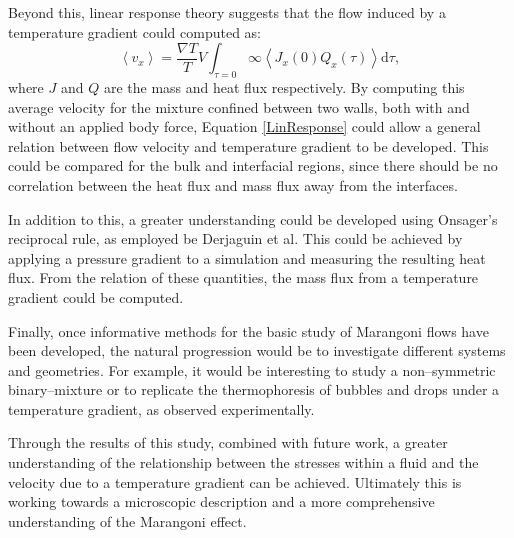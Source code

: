 Beyond this, linear response theory suggests that the flow induced by a temperature gradient could computed as:
\begin{equation}
\left< v_{x} \right> = \frac{\nabla T}{T} V \int_{\tau =0}{\infty} \left< J_{x}(0) Q_{x}(\tau) \right> \mathrm{d} \tau,
\label{LinResponse}
\end{equation}
where $J$ and $Q$ are the mass and heat flux respectively.
By computing this average velocity for the mixture confined between two walls, both with and without an applied body force, Equation \ref{LinResponse} could allow a general relation between flow velocity and temperature gradient to be developed.
This could be compared for the bulk and interfacial regions, since there should be no correlation between the heat flux and mass flux away from the interfaces.

In addition to this, a greater understanding could be developed using Onsager's reciprocal rule, as employed be Derjaguin et al.
This could be achieved by applying a pressure gradient to a simulation and measuring the resulting heat flux.
From the relation of these quantities, the mass flux from a temperature gradient could be computed. 

Finally, once informative methods for the basic study of Marangoni flows have been developed, the natural progression would be to investigate different systems and geometries.
For example, it would be interesting to study a non--symmetric binary--mixture or to replicate the thermophoresis of bubbles and drops under a temperature gradient, as observed experimentally.

Through the results of this study, combined with future work, a greater understanding of the relationship between the stresses within a fluid and the velocity due to a temperature gradient can be achieved. 
Ultimately this is working towards a microscopic description and a more comprehensive understanding of the Marangoni effect.
